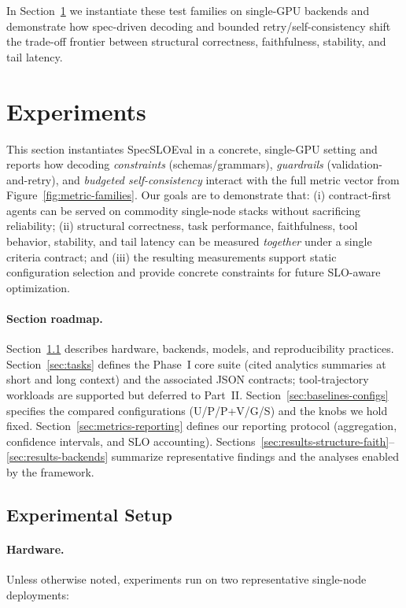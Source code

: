 \documentclass[11pt]{article}
\begin{document}
\medskip
In Section~\ref{sec:experiments} we instantiate these test families on single-GPU backends and demonstrate how spec-driven decoding and bounded retry/self-consistency shift the trade-off frontier between structural correctness, faithfulness, stability, and tail latency.

\section{Experiments}
\label{sec:experiments}

This section instantiates SpecSLOEval in a concrete, single-GPU setting and reports how decoding \emph{constraints} (schemas/grammars), \emph{guardrails} (validation-and-retry), and \emph{budgeted self-consistency} interact with the full metric vector from Figure~\ref{fig:metric-families}.
Our goals are to demonstrate that:
(i) contract-first agents can be served on commodity single-node stacks without sacrificing reliability;
(ii) structural correctness, task performance, faithfulness, tool behavior, stability, and tail latency can be measured \emph{together} under a single criteria contract; and
(iii) the resulting measurements support static configuration selection and provide concrete constraints for future SLO-aware optimization.

\paragraph{Section roadmap.}
Section~\ref{sec:setup} describes hardware, backends, models, and reproducibility practices.
Section~\ref{sec:tasks} defines the Phase~I core suite (cited analytics summaries at short and long context) and the associated JSON contracts; tool-trajectory workloads are supported but deferred to Part~II.
Section~\ref{sec:baselines-configs} specifies the compared configurations (U/P/P+V/G/S) and the knobs we hold fixed.
Section~\ref{sec:metrics-reporting} defines our reporting protocol (aggregation, confidence intervals, and SLO accounting).
Sections~\ref{sec:results-structure-faith}--\ref{sec:results-backends} summarize representative findings and the analyses enabled by the framework.

\subsection{Experimental Setup}
\label{sec:setup}

\paragraph{Hardware.}
Unless otherwise noted, experiments run on two representative single-node deployments:
\end{document}
